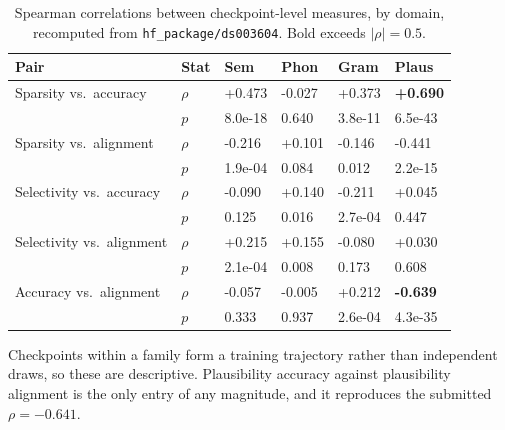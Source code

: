 \begin{table}[t]
\centering
\small
\begin{tabular}{llllll}
\toprule
Pair & Stat & Sem & Phon & Gram & Plaus \\
\midrule
Sparsity vs.\ accuracy & $\rho$ & +0.473 & -0.027 & +0.373 & \textbf{+0.690} \\
 & $p$ & 8.0e-18 & 0.640 & 3.8e-11 & 6.5e-43 \\
Sparsity vs.\ alignment & $\rho$ & -0.216 & +0.101 & -0.146 & -0.441 \\
 & $p$ & 1.9e-04 & 0.084 & 0.012 & 2.2e-15 \\
Selectivity vs.\ accuracy & $\rho$ & -0.090 & +0.140 & -0.211 & +0.045 \\
 & $p$ & 0.125 & 0.016 & 2.7e-04 & 0.447 \\
Selectivity vs.\ alignment & $\rho$ & +0.215 & +0.155 & -0.080 & +0.030 \\
 & $p$ & 2.1e-04 & 0.008 & 0.173 & 0.608 \\
Accuracy vs.\ alignment & $\rho$ & -0.057 & -0.005 & +0.212 & \textbf{-0.639} \\
 & $p$ & 0.333 & 0.937 & 2.6e-04 & 4.3e-35 \\
\bottomrule
\end{tabular}
\vspace{2pt}
\begin{minipage}{\linewidth}\footnotesize Checkpoints within a family form a training trajectory rather than independent draws, so these are descriptive. Plausibility accuracy against plausibility alignment is the only entry of any magnitude, and it reproduces the submitted $\rho = -0.641$.\end{minipage}
\caption{Spearman correlations between checkpoint-level measures, by domain, recomputed from \texttt{hf\_package/ds003604}. Bold exceeds $|\rho| = 0.5$.}
\label{tab:t2}
\end{table}
